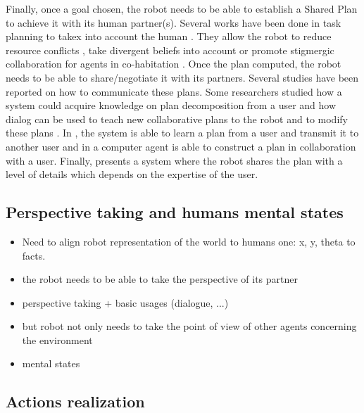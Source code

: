 \documentclass[english,a4paper,11pt,twoside]{StyleThese}
\begin{document}
Finally, once a goal chosen, the robot needs to be able to establish a Shared Plan to achieve it with its human partner(s). Several works have been done in task planning to takex into account the human \cite{cirillo2010human,Lallement2014hatp}. They allow the robot to reduce resource conflicts \cite{chakraborti2016planning}, take divergent beliefs into account \cite{guitton2012belief,talamadupula2014coordination} or promote stigmergic collaboration
for agents in co-habitation \cite{chakraborti2015planning}. 
Once the plan computed, the robot needs to be able to share/negotiate it with its partners. Several studies have been reported on how to communicate these plans. Some researchers studied how a system could acquire knowledge on plan decomposition from a user \cite{Mohseni2015} and how dialog can be used to teach new collaborative plans to the robot and to modify these plans \cite{petit2013coordinating}. In \cite{sorce2015proof}, the system is able to learn a plan from a user and transmit it to another user and in \cite{allen2002human} a computer agent is able to construct a plan in collaboration with a user. Finally, \cite{milliez2016using} presents a system where the robot shares the plan with a level of details which depends on the expertise of the user.

\subsection{Perspective taking and humans mental states}

\label{subsec:perspective_taking}

\begin{itemize}
\item Need to align robot representation of the world to humans one: x, y, theta to facts.
\item the robot needs to be able to take the perspective of its partner
\item perspective taking + basic usages (dialogue, ...)
\item but robot not only needs to take the point of view of other agents concerning the environment
\item mental states
\end{itemize}

\subsection{Actions realization}

\label{subsec:action}
\end{document}
